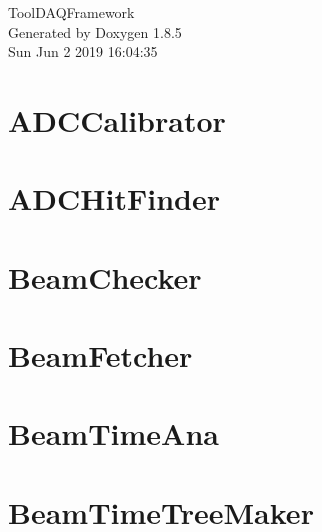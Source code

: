 \documentclass[twoside]{book}
\newcommand{\clearemptydoublepage}{%
  \newpage{\pagestyle{empty}\cleardoublepage}%
}
\begin{document}
\hypersetup{pageanchor=false}
\begin{titlepage}
\vspace*{7cm}
\begin{center}%
{\Large Tool\-D\-A\-Q\-Framework }\\
\vspace*{1cm}
{\large Generated by Doxygen 1.8.5}\\
\vspace*{0.5cm}
{\small Sun Jun 2 2019 16:04:35}\\
\end{center}
\end{titlepage}
\clearemptydoublepage
\tableofcontents
\clearemptydoublepage
{}
\hypersetup{pageanchor=true}

\chapter{A\-D\-C\-Calibrator}
\label{md_UserTools_ADCCalibrator_README}
\hypertarget{md_UserTools_ADCCalibrator_README}{}

\chapter{A\-D\-C\-Hit\-Finder}
\label{md_UserTools_ADCHitFinder_README}
\hypertarget{md_UserTools_ADCHitFinder_README}{}

\chapter{Beam\-Checker}
\label{md_UserTools_BeamChecker_README}
\hypertarget{md_UserTools_BeamChecker_README}{}

\chapter{Beam\-Fetcher}
\label{md_UserTools_BeamFetcher_README}
\hypertarget{md_UserTools_BeamFetcher_README}{}

\chapter{Beam\-Time\-Ana}
\label{md_UserTools_BeamTimeAna_README}
\hypertarget{md_UserTools_BeamTimeAna_README}{}

\chapter{Beam\-Time\-Tree\-Maker}
\label{md_UserTools_BeamTimeTreeMaker_README}
\hypertarget{md_UserTools_BeamTimeTreeMaker_README}{}

\end{document}
